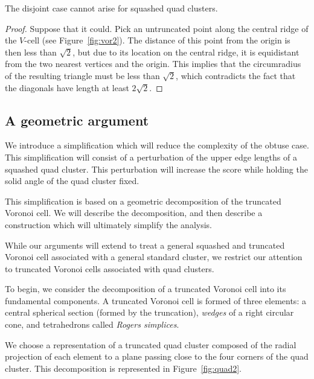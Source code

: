 \begin{lem}
\label{lem:pure:disjoint}
The disjoint case cannot arise for squashed quad clusters.
\end{lem}
\begin{proof}
Suppose that it could.  Pick an untruncated point
along the central ridge of the $V$-cell (see Figure~\ref{fig:vor2}).
The distance of this point
from the origin is then less than $\sqrt{2}$, but due to its location
on the central ridge, it is equidistant from the two nearest vertices
and the origin.  This implies that the circumradius of the resulting
triangle must be less than $\sqrt{2}$, which contradicts the fact
that the diagonals have length at least $2\sqrt{2}$.
\end{proof}


\subsection{A geometric argument}
We introduce a simplification which will reduce the complexity of
the obtuse case.  This simplification will consist of a perturbation of
the upper edge lengths of a squashed quad cluster.  This perturbation
will increase the score while holding the
solid angle of the quad cluster fixed.

This simplification is based on a geometric decomposition of the
truncated Voronoi cell.  We will describe the decomposition, and
then describe a construction which will ultimately simplify the
analysis.

While our arguments will extend to treat a general
squashed and truncated Voronoi cell associated with a general
standard cluster, we restrict our attention to truncated
Voronoi cells associated with quad clusters.

To begin, we consider the decomposition of
a truncated Voronoi cell into its fundamental components.
A truncated Voronoi cell is formed of three elements:  a
central spherical section (formed by the truncation), {\em wedges} of
a right circular cone, and tetrahedrons called {\em Rogers simplices}.

We choose a representation of a truncated quad cluster composed of
the radial projection of each element to a plane passing close to
the four corners of the quad cluster.
This decomposition
is represented in Figure~\ref{fig:quad2}.

